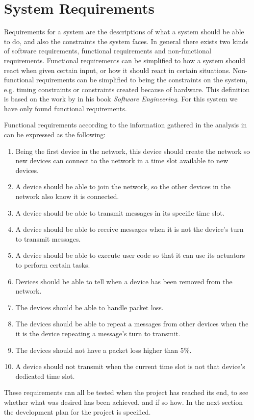 \section{System Requirements}\label{requirements}
Requirements for a system are the descriptions of what a system should be able to do, and also the constraints the system faces.
In general there exists two kinds of software requirements, functional requirements and non-functional requirements. 
Functional requirements can be simplified to how a system should react when given certain input, or how it should react in certain situations.
Non-functional requirements can be simplified to being the constraints on the system, e.g. timing constraints or constraints created because of hardware.
This definition is based on the work by \citet[see][chapter 4]{SEBook} in his book \textit{Software Engineering}.
For this system we have only found functional requirements.

Functional requirements according to the information gathered in the analysis in  can be expressed as the following: 


\begin{enumerate}[label=\itshape \alph*\upshape)]
    \item Being the first device in the network, this device should create the network so new devices can connect to the network in a time slot available to new devices.
    \item A device should be able to join the network, so the other devices in the network also know it is connected.
    \item A device should be able to transmit messages in its specific time slot.
    \item A device should be able to receive messages when it is not the device's turn to transmit messages.
    \item A device should be able to execute user code so that it can use its actuators to perform certain tasks.
    \item Devices should be able to tell when a device has been removed from the network.
    \item The devices should be able to handle packet loss.
    \item The devices should be able to repeat a messages from other devices when the it is the device repeating a message's turn to transmit.
    \item The devices should not have a packet loss higher than 5\%.
    \item A device should not transmit when the current time slot is not that device's dedicated time slot. 
\end{enumerate}

These requirements can all be tested when the project has reached its end, to see whether what was desired has been achieved, and if so how. 
In the next section the development plan for the project is specified.